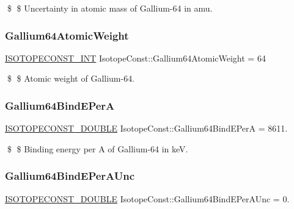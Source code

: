 \$ \$ Uncertainty in atomic mass of Gallium-\/64 in amu. \mbox{\label{group___isotope_const-_gallium-_ga64_gadf56e81c92f0e5085334a48874d7214f}} 
\subsubsection{\texorpdfstring{Gallium64\+Atomic\+Weight}{Gallium64AtomicWeight}}
{\footnotesize\ttfamily \mbox{\hyperlink{group___isotope_const-_macros_ga5f18360b3e99483a35c32d789e62621c}{I\+S\+O\+T\+O\+P\+E\+C\+O\+N\+S\+T\+\_\+\+I\+NT}} Isotope\+Const\+::\+Gallium64\+Atomic\+Weight = 64}

\$ \$ Atomic weight of Gallium-\/64. \mbox{\label{group___isotope_const-_gallium-_ga64_ga9619e3a0155dfe0c25e5d1a616658e50}} 
\subsubsection{\texorpdfstring{Gallium64\+Bind\+E\+PerA}{Gallium64BindEPerA}}
{\footnotesize\ttfamily \mbox{\hyperlink{group___isotope_const-_macros_ga8f45a7272ce02c0b4c65c44636ed719a}{I\+S\+O\+T\+O\+P\+E\+C\+O\+N\+S\+T\+\_\+\+D\+O\+U\+B\+LE}} Isotope\+Const\+::\+Gallium64\+Bind\+E\+PerA = 8611.}

\$ \$ Binding energy per A of Gallium-\/64 in keV. \mbox{\label{group___isotope_const-_gallium-_ga64_ga7e28c17568c8532736f4d637f830c356}} 
\subsubsection{\texorpdfstring{Gallium64\+Bind\+E\+Per\+A\+Unc}{Gallium64BindEPerAUnc}}
{\footnotesize\ttfamily \mbox{\hyperlink{group___isotope_const-_macros_ga8f45a7272ce02c0b4c65c44636ed719a}{I\+S\+O\+T\+O\+P\+E\+C\+O\+N\+S\+T\+\_\+\+D\+O\+U\+B\+LE}} Isotope\+Const\+::\+Gallium64\+Bind\+E\+Per\+A\+Unc = 0.}

